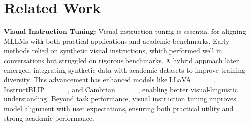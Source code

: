 \section{Related Work}
\textbf{Visual Instruction Tuning:}  
Visual instruction tuning is essential for aligning MLLMs with both practical applications and academic benchmarks. Early methods relied on synthetic visual instructions, which performed well in conversations but struggled on rigorous benchmarks. A hybrid approach later emerged, integrating synthetic data with academic datasets to improve training diversity. This advancement has enhanced models like LLaVA ____, InstructBLIP ____, and Cambrian ____, enabling better visual-linguistic understanding. Beyond task performance, visual instruction tuning improves model alignment with user expectations, ensuring both practical utility and strong academic performance.

\noindent

